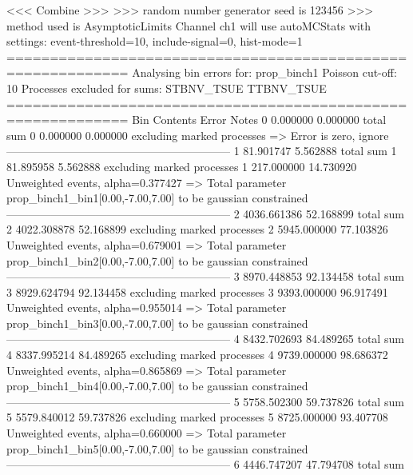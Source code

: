  <<< Combine >>> 
>>> random number generator seed is 123456
>>> method used is AsymptoticLimits
Channel ch1 will use autoMCStats with settings: event-threshold=10, include-signal=0, hist-mode=1
============================================================
Analysing bin errors for: prop_binch1
Poisson cut-off: 10
Processes excluded for sums: STBNV_TSUE TTBNV_TSUE
============================================================
Bin        Contents        Error           Notes                         
0          0.000000        0.000000        total sum                     
0          0.000000        0.000000        excluding marked processes    
  => Error is zero, ignore      
------------------------------------------------------------
1          81.901747       5.562888        total sum                     
1          81.895958       5.562888        excluding marked processes    
1          217.000000      14.730920       Unweighted events, alpha=0.377427
  => Total parameter prop_binch1_bin1[0.00,-7.00,7.00] to be gaussian constrained
------------------------------------------------------------
2          4036.661386     52.168899       total sum                     
2          4022.308878     52.168899       excluding marked processes    
2          5945.000000     77.103826       Unweighted events, alpha=0.679001
  => Total parameter prop_binch1_bin2[0.00,-7.00,7.00] to be gaussian constrained
------------------------------------------------------------
3          8970.448853     92.134458       total sum                     
3          8929.624794     92.134458       excluding marked processes    
3          9393.000000     96.917491       Unweighted events, alpha=0.955014
  => Total parameter prop_binch1_bin3[0.00,-7.00,7.00] to be gaussian constrained
------------------------------------------------------------
4          8432.702693     84.489265       total sum                     
4          8337.995214     84.489265       excluding marked processes    
4          9739.000000     98.686372       Unweighted events, alpha=0.865869
  => Total parameter prop_binch1_bin4[0.00,-7.00,7.00] to be gaussian constrained
------------------------------------------------------------
5          5758.502300     59.737826       total sum                     
5          5579.840012     59.737826       excluding marked processes    
5          8725.000000     93.407708       Unweighted events, alpha=0.660000
  => Total parameter prop_binch1_bin5[0.00,-7.00,7.00] to be gaussian constrained
------------------------------------------------------------
6          4446.747207     47.794708       total sum                     
